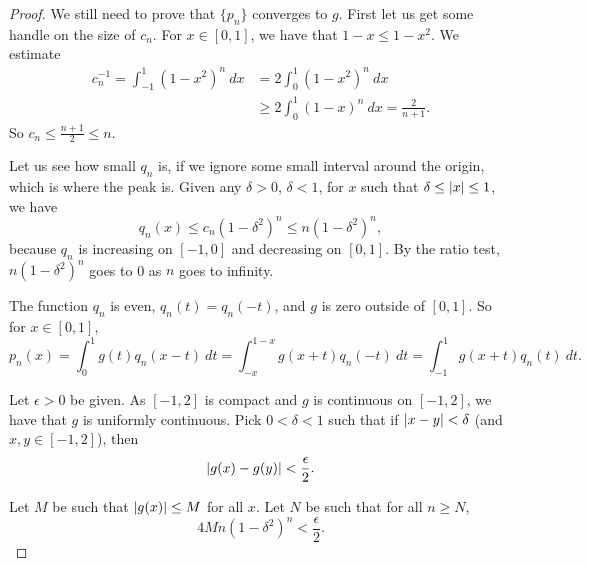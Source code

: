 \begin{proof}
We still need to prove that $\{ p_n \}$ converges to $g$.  First let us
get some handle on the size of $c_n$.
For $x \in [0,1]$, we have that $1-x \leq 1-x^2$.  We estimate
\begin{equation*}
\begin{split}
c_n^{-1}   = \int_{-1}^1 {(1-x^2)}^n ~ dx
& = 2\int_0^1 {(1-x^2)}^n ~ dx \\
& \geq 2\int_0^{1} {(1-x)}^n ~ dx
= \frac{2}{n+1} .
\end{split}
\end{equation*}
So $c_n \leq \frac{n+1}{2} \leq n$.

Let us see how small $q_n$ is, if we ignore some small interval around the origin,
which is where the peak is.
Given any $\delta > 0$, $\delta < 1$, for
$x$ such that $\delta \leq \lvert {x} \rvert \leq 1$, we have
\begin{equation*}
q_n(x) \leq c_n {(1-\delta^2)}^n \leq  n{(1-\delta^2)}^n ,
\end{equation*}
because $q_n$ is increasing on $[-1,0]$ and decreasing on $[0,1]$.
By the ratio test, 
$n{(1-\delta^2)}^n$ goes to 0 as $n$ goes to infinity.

The function $q_n$ is even, $q_n(t) = q_n(-t)$, and $g$
is zero outside of $[0,1]$.
So for $x \in [0,1]$,
\begin{equation*}
p_n(x) = 
\int_{0}^1 g(t)q_n(x-t)  ~ dt
=
\int_{-x}^{1-x} g(x+t)q_n(-t)  ~ dt
=
\int_{-1}^{1} g(x+t)q_n(t)  ~ dt .
\end{equation*}

Let $\epsilon > 0$ be given.
As $[-1,2]$ is compact and $g$ is continuous on $[-1,2]$, we have that $g$ is uniformly continuous.
Pick $0 < \delta < 1$ such that if
$\lvert {x-y} \rvert < \delta$ (and $x,y \in [-1,2]$), then
\begin{equation*}
\lvert {g(x)-g(y)} \rvert < \frac{\epsilon}{2} .
\end{equation*}

Let $M$ be such that $\lvert {g(x)} \rvert \leq M$ for all $x$.  Let $N$ be
such that for all $n \geq N$,
\begin{equation*}
4M n{(1-\delta^2)}^n < \frac{\epsilon}{2} .
\end{equation*}


\end{proof}

